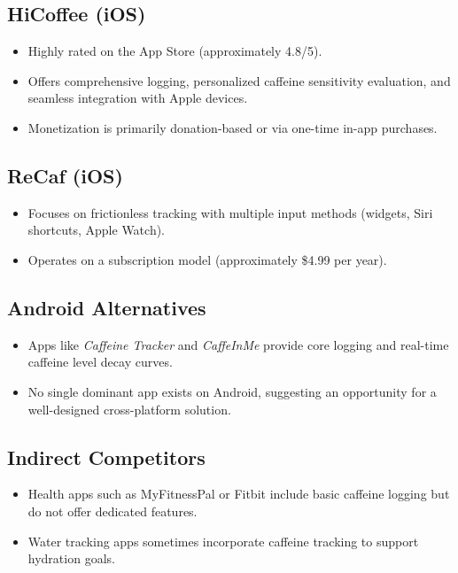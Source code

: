 \documentclass[11pt]{article}
\begin{document}
\subsection{HiCoffee (iOS)}
\begin{itemize}[noitemsep]
    \item Highly rated on the App Store (approximately 4.8/5).
    \item Offers comprehensive logging, personalized caffeine sensitivity evaluation, and seamless integration with Apple devices.
    \item Monetization is primarily donation-based or via one-time in-app purchases.
\end{itemize}

\subsection{ReCaf (iOS)}
\begin{itemize}[noitemsep]
    \item Focuses on frictionless tracking with multiple input methods (widgets, Siri shortcuts, Apple Watch).
    \item Operates on a subscription model (approximately \$4.99 per year).
\end{itemize}

\subsection{Android Alternatives}
\begin{itemize}[noitemsep]
    \item Apps like \textit{Caffeine Tracker} and \textit{CaffeInMe} provide core logging and real-time caffeine level decay curves.
    \item No single dominant app exists on Android, suggesting an opportunity for a well-designed cross-platform solution.
\end{itemize}

\subsection{Indirect Competitors}
\begin{itemize}[noitemsep]
    \item Health apps such as MyFitnessPal or Fitbit include basic caffeine logging but do not offer dedicated features.
    \item Water tracking apps sometimes incorporate caffeine tracking to support hydration goals.
\end{itemize}
\end{document}

